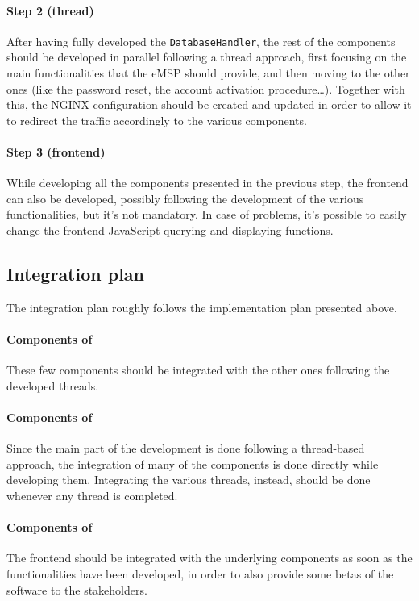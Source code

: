 \paragraph{Step 2 (thread)}\label{emsp:thread} After having fully developed the \texttt{DatabaseHandler}, the rest of the components should be developed in parallel following a thread approach, first focusing on the main functionalities that the eMSP should provide, and then moving to the other ones (like the password reset, the account activation procedure\dots). Together with this, the NGINX configuration should be created and updated in order to allow it to redirect the traffic accordingly to the various components.

\paragraph{Step 3 (frontend)}\label{emsp:frontend} While developing all the components presented in the previous step, the frontend can also be developed, possibly following the development of the various functionalities, but it's not mandatory. In case of problems, it's possible to easily change the frontend JavaScript querying and displaying functions.

\subsection{Integration plan}

The integration plan roughly follows the implementation plan presented above.

\paragraph{Components of } These few components should be integrated with the other ones following the developed threads.

\paragraph{Components of } Since the main part of the development is done following a thread-based approach, the integration of many of the components is done directly while developing them. Integrating the various threads, instead, should be done whenever any thread is completed.

\paragraph{Components of } The frontend should be integrated with the underlying components as soon as the functionalities have been developed, in order to also provide some betas of the software to the stakeholders.

